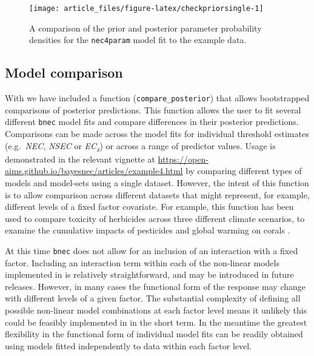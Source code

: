 \documentclass[
  shortnames]{jss}
\begin{document}
\begin{CodeChunk}
\begin{figure}[!ht]

{\centering \texttt{[image: article\_files/figure-latex/checkpriorsingle-1]} 

}

\caption[A comparison of the prior and posterior parameter probability densities for the \texttt{nec4param} model fit to the example data]{A comparison of the prior and posterior parameter probability densities for the \texttt{nec4param} model fit to the example data.}\label{fig:checkpriorsingle}
\end{figure}
\end{CodeChunk}

\hypertarget{model-comparison}{%
\subsection{Model comparison}\label{model-comparison}}

With  we have included a function (\texttt{compare\_posterior}) that allows bootstrapped comparisons of posterior predictions. This function allows the user to fit several different \texttt{bnec} model fits and compare differences in their posterior predictions. Comparisons can be made across the model fits for individual threshold estimates (e.g.~\emph{NEC}, \emph{NSEC} or \emph{EC\textsubscript{x}}) or across a range of predictor values. Usage is demonstrated in the relevant vignette at \url{https://open-aims.github.io/bayesnec/articles/example4.html} by comparing different types of models and model-sets using a single dataset. However, the intent of this function is to allow comparison across different datasets that might represent, for example, different levels of a fixed factor covariate. For example, this function has been used to compare toxicity of herbicides across three different climate scenarios, to examine the cumulative impacts of pesticides and global warming on corals \citep{flores2021}.

At this time \texttt{bnec} does not allow for an inclusion of an interaction with a fixed factor. Including an interaction term within each of the non-linear models implemented in  is relatively straightforward, and may be introduced in future releases. However, in many cases the functional form of the response may change with different levels of a given factor. The substantial complexity of defining all possible non-linear model combinations at each factor level means it unlikely this could be feasibly implemented in  in the short term. In the meantime the greatest flexibility in the functional form of individual model fits can be readily obtained using models fitted independently to data within each factor level.
\end{document}
